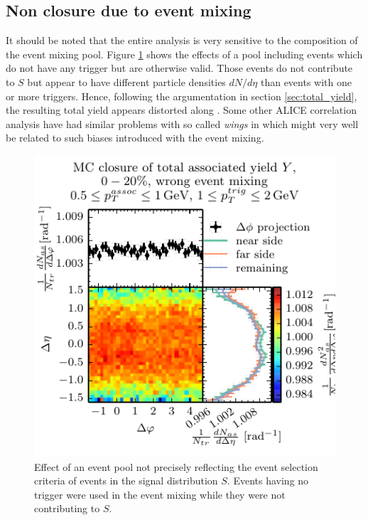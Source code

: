\subsection{Non closure due to event mixing}
\label{sec:sensitivity_pool_composition}

It should be noted that the entire analysis is very sensitive to the composition of the event mixing pool. Figure \ref{fig:wrong_pool} shows the effects of a pool including events which do not have any trigger but are otherwise valid. Those events do not contribute to $S$ but appear to have different particle densities $dN/d\eta$ than events with one or more triggers. Hence, following the argumentation in section \ref{sec:total_yield}, the resulting total yield appears distorted along \deta. Some other ALICE correlation analysis \cite{Schuster2013} have had similar problems with so called \emph{wings} in \deta which might very well be related to such biases introduced with the event mixing.

\begin{figure}
  \centering
  \includegraphics{figures/closure_bad_pool_example.pdf}
  \caption[Effect of an event pool not precisely reflecting the event selection criteria of events in the signal distribution $S$.]{Effect of an event pool not precisely reflecting the event selection criteria of events in the signal distribution $S$. Events having no trigger were used in the event mixing while they were not contributing to $S$.}
  \label{fig:wrong_pool}
\end{figure}



